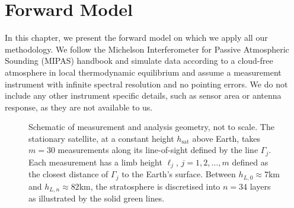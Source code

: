 \chapter{Forward Model}
\label{ch:formodel}

In this chapter, we present the forward model on which we apply all our methodology. We follow the Michelson Interferometer for Passive Atmospheric Sounding (MIPAS) handbook \cite{mipas2000handbook} and simulate data according to a cloud-free atmosphere in local thermodynamic equilibrium and assume a measurement instrument with infinite spectral resolution and no pointing errors.
We do not include any other instrument specific details, such as sensor area or antenna response, as they are not available to us. 
\begin{figure}[ht!]
	\centering
	
	\caption[Schematic of measurement and analysis geometry.]{Schematic of measurement and analysis geometry, not to scale.
		The stationary satellite, at a constant height $h_\text{sat}$ above Earth, takes $m = 30$ measurements along its line-of-sight defined by the line $\Gamma_j$.
		Each measurement has a limb height $\ell_j$, $j=1,2,\dots,m$ defined as the closest distance of $\Gamma_j$ to the Earth's surface.
		Between $h_{L,0} \approx 7$km and $h_{L,n} \approx 82$km, the stratosphere is discretised into $n =34$ layers as illustrated by the solid green lines.}
	\label{fig:LIMB}
\end{figure}



